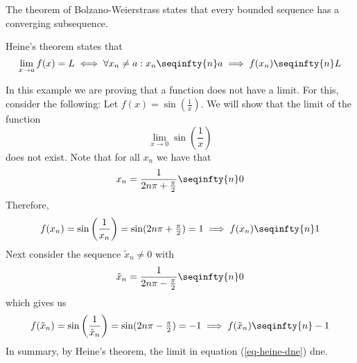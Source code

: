 \begin{thm}\label{thm-bolzano-weierstrass}
	The theorem of Bolzano-Weierstrass states that every bounded sequence has a
	converging subsequence.
\end{thm}

\begin{thm}\label{thm-heines-theorem}
	Heine's theorem states that
	\begin{equation*}
		\lim_{x\to a}f(x)=L \iff \forall x_n\neq a: x_n \seqinfty{n} a \implies f(x_n) \seqinfty{n} L
	\end{equation*}
\end{thm}

\begin{exm}\label{exm-heine:1}
	In this example we are proving that a function does not have a limit. For this,
	consider the following: Let $f(x)=\sin\left(\tfrac{1}{x}\right)$. We will show
	that the limit of the function
	\begin{equation}\label{eq-heine-dne}
		\lim_{x\to0}\sin\left(\frac{1}{x}\right)
	\end{equation}
	does not exist. Note that for all $x_n$ we have that
	\begin{equation*}
		x_n=\frac{1}{2n\pi+\tfrac{\pi}{2}} \seqinfty{n} 0
	\end{equation*}
	Therefore,
	\begin{equation*}
		f(x_n)=\sin\left(\frac{1}{x_n}\right)=\sin(2n\pi+\tfrac{\pi}{2})=1
		\implies f(x_n) \seqinfty{n} 1
	\end{equation*}
	Next consider the sequence $\tilde{x}_n\neq0$ with
	\begin{equation*}
		\tilde{x}_n=\frac{1}{2n\pi-\tfrac{\pi}{2}} \seqinfty{n} 0
	\end{equation*}
	which gives us
	\begin{equation*}
		f(\tilde{x}_n)=\sin\left(\frac{1}{\tilde{x}_n}\right)=\sin(2n\pi-\tfrac{\pi}{2})=-1
		\implies f(\tilde{x}_n) \seqinfty{n} -1
	\end{equation*}
	In summary, by Heine's theorem, the limit in equation (\ref{eq-heine-dne}) \gls{dne}.
\end{exm}

